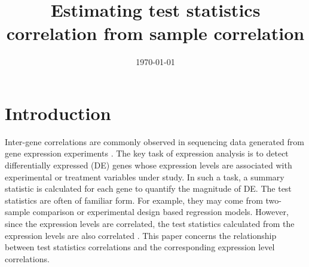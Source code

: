 \documentclass[12pt, a4paper]{article}
\title{Estimating test statistics correlation from sample correlation}
\date{\today} %
\begin{document}
	\maketitle
	\section{Introduction}
%	
%
%	

	Inter-gene correlations are commonly observed in sequencing data generated from gene expression 
	experiments \citep{efron2012large, qiu2005effects,storey2003positive, huang2013gene, 
	gatti2010heading}.
	The key task of expression analysis is to detect differentially expressed (DE) genes whose 
	expression levels are associated with experimental or treatment variables under study. 
	In such a task, 
	a summary statistic is calculated for each gene to quantify the magnitude of DE. The test 
	statistics are often of familiar form. For example, 
	they may come from two-sample comparison or experimental design based regression models. 
	However, since the expression levels are correlated, the test statistics calculated from the 
	expression levels are also correlated \citep{barry2008statistical, efron2007correlation, 
	wu2012camera}. This paper concerns the relationship between test 
	statistics correlations and the corresponding expression level correlations.
\end{document}
